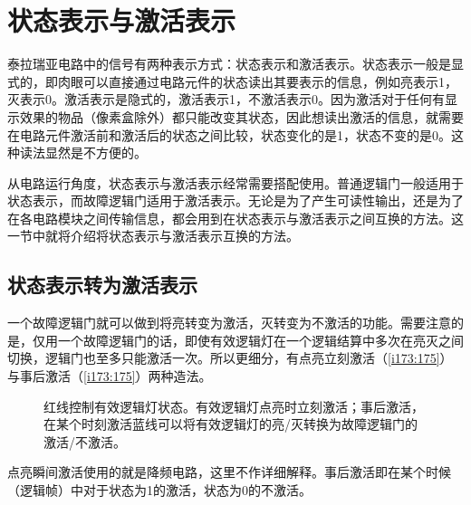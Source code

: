 \section{状态表示与激活表示}

泰拉瑞亚电路中的信号有两种表示方式：状态表示和激活表示。状态表示一般是显式的，即肉眼可以直接通过电路元件的状态读出其要表示的信息，例如亮表示1，灭表示0。激活表示是隐式的，激活表示1，不激活表示0。因为激活对于任何有显示效果的物品（像素盒除外）都只能改变其状态，因此想读出激活的信息，就需要在电路元件激活前和激活后的状态之间比较，状态变化的是1，状态不变的是0。这种读法显然是不方便的。

从电路运行角度，状态表示与激活表示经常需要搭配使用。普通逻辑门一般适用于状态表示，而故障逻辑门适用于激活表示。无论是为了产生可读性输出，还是为了在各电路模块之间传输信息，都会用到在状态表示与激活表示之间互换的方法。这一节中就将介绍将状态表示与激活表示互换的方法。

\subsection{状态表示转为激活表示}

一个故障逻辑门就可以做到将亮转变为激活，灭转变为不激活的功能。需要注意的是，仅用一个故障逻辑门的话，即使有效逻辑灯在一个逻辑结算中多次在亮灭之间切换，逻辑门也至多只能激活一次。所以更细分，有点亮立刻激活（\autoref{i173:175}）与事后激活（\autoref{i173:175}）两种造法。

\begin{figure}[!ht]
  \centering
  \caption{红线控制有效逻辑灯状态。\protect{}有效逻辑灯点亮时立刻激活；\protect{}事后激活，在某个时刻激活蓝线可以将有效逻辑灯的亮/灭转换为故障逻辑门的激活/不激活。}
  \label{i173:175}
\end{figure}

点亮瞬间激活使用的就是降频电路，这里不作详细解释。事后激活即在某个时候（逻辑帧）中对于状态为1的激活，状态为0的不激活。

